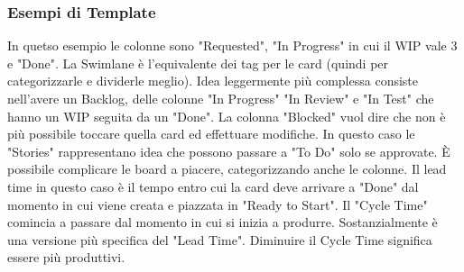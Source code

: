 \subsubsection{Esempi di Template}
In quetso esempio le colonne sono "Requested", "In Progress" in cui il WIP vale 3 e "Done". La Swimlane è l'equivalente dei tag per le card (quindi per categorizzarle e dividerle meglio).
\noindent Idea leggermente più complessa consiste nell'avere un Backlog, delle colonne "In Progress" "In Review" e "In Test" che hanno un WIP seguita da un "Done". La colonna "Blocked" vuol dire che non è più possibile toccare quella card ed effettuare modifiche.
\noindent In questo caso le "Stories" rappresentano idea che possono passare a "To Do" solo se approvate.
\noindent È possibile complicare le board a piacere, categorizzando anche le colonne.
\noindent Il lead time in questo caso è il tempo entro cui la card deve arrivare a "Done" dal momento in cui viene creata e piazzata in "Ready to Start".
\noindent Il "Cycle Time" comincia a passare dal momento in cui si inizia a produrre. Sostanzialmente è una versione più specifica del "Lead Time". Diminuire il Cycle Time significa essere più produttivi.

